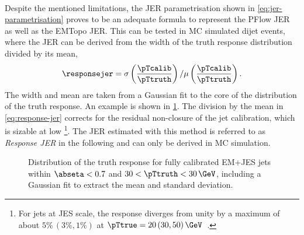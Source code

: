\paragraph{}
Despite the mentioned limitations, the JER parametrisation shown in \cref{eq:jer-parametrisation} proves to be an adequate formula to represent the PFlow JER as well as the EMTopo JER.
This can be tested in MC simulated dijet events, where the JER can be derived from the width of the truth response distribution divided by its mean,
\begin{equation}
    \label{eq:response-jer}
    \responsejer = \sigma \left( \frac{\pTcalib}{\pTtruth} \right) / \mu \left( \frac{\pTcalib}{\pTtruth} \right).
\end{equation}
The width and mean are taken from a Gaussian fit to the core of the distribution of the truth response. An example is shown in \cref{fig:truth-response}. The division by the mean in \cref{eq:response-jer} corrects for the residual non-closure of the jet calibration, which is sizable at low \pT\footnote{For jets at JES scale, the response diverges from unity by a maximum of about $5\%\,(3\%, 1\%)$ at $\pTtrue = 20\,(30, 50)\,\GeV$~\cite{JETM-2018-05}.}. 
The JER estimated with this method is referred to as \emph{Response JER} in the following and can only be derived in MC simulation.

\begin{figure}[t]
    \caption[Distribution of the truth response for fully calibrated EM+JES jets.]{Distribution of the truth response for fully calibrated EM+JES jets within $\abseta < 0.7$ and $30 < \pTtruth < 30\,\GeV$, including a Gaussian fit to extract the mean and standard deviation.}
    \label{fig:truth-response}
\end{figure}

